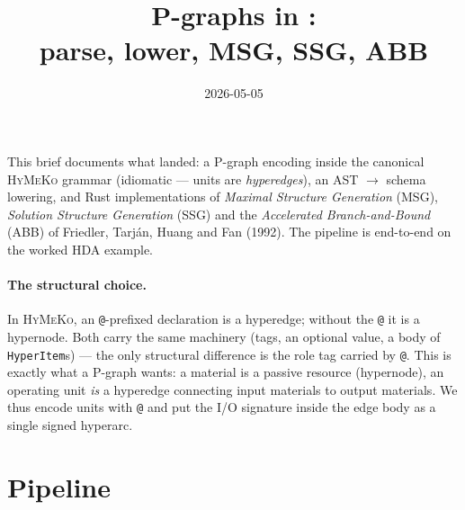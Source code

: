 \documentclass[11pt,a4paper]{article}
\title{P-graphs in \HyMeKo:\\[2pt]
       \large{\normalfont parse, lower, MSG, SSG, ABB}}
\author{}
\date{2026-05-05}
\newcommand{\HyMeKo}{\textsc{HyMeKo}}
\newcommand{\code}[1]{\texttt{\small #1}}
\begin{document}
\maketitle

\noindent
This brief documents what landed: a P-graph encoding inside the
canonical \HyMeKo{} grammar (idiomatic --- units are
\emph{hyperedges}), an AST $\to$ schema lowering, and Rust
implementations of \emph{Maximal Structure Generation} (MSG),
\emph{Solution Structure Generation} (SSG) and the
\emph{Accelerated Branch-and-Bound} (ABB) of Friedler, Tarj\'an,
Huang and Fan (1992). The pipeline is end-to-end on the worked HDA
example.

\paragraph{The structural choice.} In \HyMeKo, an \code{@}-prefixed
declaration is a hyperedge; without the \code{@} it is a hypernode.
Both carry the same machinery (tags, an optional value, a body of
\code{HyperItem}s) --- the only structural difference is the role
tag carried by \code{@}. This is exactly what a P-graph wants: a
material is a passive resource (hypernode), an operating unit
\emph{is} a hyperedge connecting input materials to output materials.
We thus encode units with \code{@} and put the I/O signature inside
the edge body as a single signed hyperarc.

\section{Pipeline}

\begin{center}
\end{center}
\end{document}
